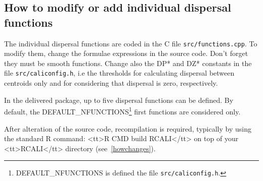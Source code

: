 \subsection{How to modify or add individual dispersal functions}
\label{modifyfunctions}
The individual dispersal functions are coded in the C file
 \texttt{src/functions.cpp}.
To modify them, change the formulae expressions in the source code.
Don't forget they must be smooth functions.
Change also the DP* and DZ* constants
 in the file \texttt{src/caliconfig.h},
i.e the thresholds for  calculating dispersal between centroids only
and for considering that dispersal is zero, respectively.

In the delivered package, up to five dispersal functions 
can be defined. By default, the  DEFAULT\_NFUNCTIONS\footnote{
DEFAULT\_NFUNCTIONS is defined the file \texttt{src/caliconfig.h}.}
first functions are considered only.


After alteration of the source code, recompilation is required,
typically by using the standard R command: <tt>R CMD build RCALI</tt>
on top of your <tt>RCALI</tt> directory (see~\ref{howchanges}).
